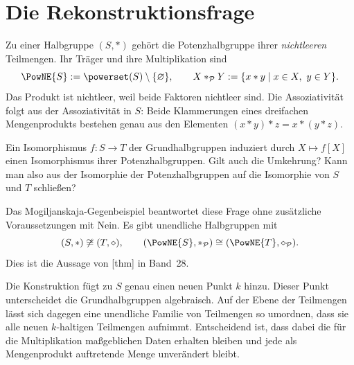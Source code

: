 \providecommand{\MogStar}{\mathbin{\ast}}
\providecommand{\MogDiamond}{\mathbin{\diamond}}

\section*{Die Rekonstruktionsfrage}
Zu einer Halbgruppe \((S,\MogStar)\) gehört die Potenzhalbgruppe ihrer
\emph{nichtleeren} Teilmengen. Ihr Träger und ihre Multiplikation sind
\[
  \PowNE{S}:=\powerset(S)\setminus\{\varnothing\},
  \qquad
  X\MogStar_{\mathcal P}Y
    :=\{x\MogStar y\mid x\in X,\ y\in Y\}.
\]
Das Produkt ist nichtleer, weil beide Faktoren nichtleer sind.
Die Assoziativität folgt aus der Assoziativität in \(S\): Beide
Klammerungen eines dreifachen Mengenprodukts bestehen genau aus den
Elementen \((x\MogStar y)\MogStar z=x\MogStar(y\MogStar z)\).

Ein Isomorphismus \(f\colon S\to T\) der Grundhalbgruppen induziert
durch \(X\mapsto f[X]\) einen Isomorphismus ihrer Potenzhalbgruppen.
Gilt auch die Umkehrung? Kann man also aus der Isomorphie der
Potenzhalbgruppen auf die Isomorphie von \(S\) und \(T\) schließen?

Das Mogiljanskaja-Gegenbeispiel beantwortet diese Frage ohne zusätzliche
Voraussetzungen mit Nein. Es gibt unendliche Halbgruppen mit
\[
  (S,\MogStar)\not\cong(T,\MogDiamond),
  \qquad
  (\PowNE{S},\MogStar_{\mathcal P})
    \cong(\PowNE{T},\MogDiamond_{\mathcal P}).
\]
Dies ist die Aussage von
[thm] in Band~28.

Die Konstruktion fügt zu \(S\) genau einen neuen Punkt \(k\) hinzu.
Dieser Punkt unterscheidet die Grundhalbgruppen algebraisch. Auf der
Ebene der Teilmengen lässt sich dagegen eine unendliche Familie von
Teilmengen so umordnen, dass sie alle neuen \(k\)-haltigen Teilmengen
aufnimmt. Entscheidend ist, dass dabei die für die Multiplikation
maßgeblichen Daten erhalten bleiben und jede als Mengenprodukt
auftretende Menge unverändert bleibt.

